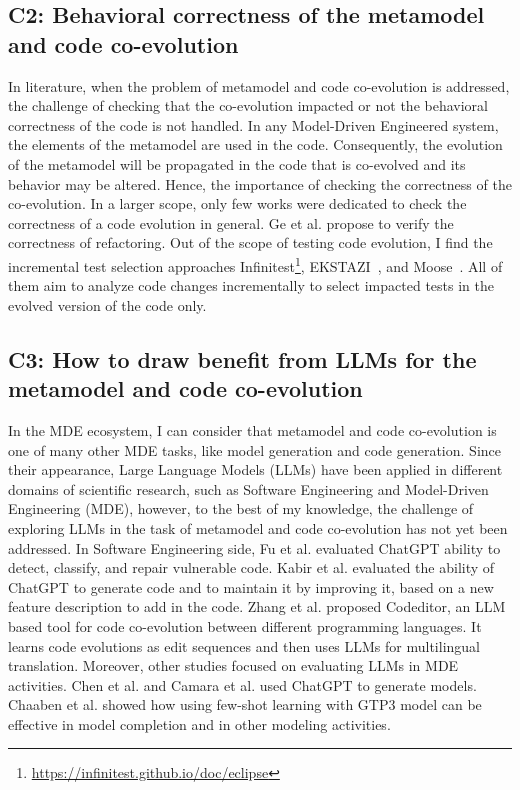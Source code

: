  

\subsection*{C2: Behavioral correctness of the metamodel and code co-evolution}
\label{C2}
In literature, when the problem of metamodel and code co-evolution is addressed, the challenge of checking that the co-evolution impacted or not the behavioral correctness of the code is not handled. In any Model-Driven Engineered system, the elements of the metamodel are used in the code. Consequently, the evolution of the metamodel will be propagated in the code that is co-evolved and its behavior may be altered. Hence, the importance of checking the correctness of the co-evolution. In a larger scope, only few works were dedicated to check the correctness of a code evolution in general. %
 Ge et al. \cite{10.1145/2568225.2568280} propose to verify the correctness of refactoring.
Out of the scope of testing code evolution, I find the incremental test selection approaches Infinitest\footnote{\url{https://infinitest.github.io/doc/eclipse}}, EKSTAZI~\cite{7203050}, and Moose~\cite{ducasse2000moose}. All of them aim to analyze code changes incrementally to select impacted tests in the evolved version of the code only.

\subsection*{C3: How to draw benefit from LLMs for the metamodel and code co-evolution}
\label{C3}
In the MDE ecosystem, I can consider that metamodel and code co-evolution is one of many other MDE tasks, like model generation and code generation. Since their appearance, Large Language Models (LLMs) have been applied in different domains of scientific research, such as Software Engineering and Model-Driven Engineering (MDE), however, to the best of my knowledge, the challenge of exploring LLMs in the task of metamodel and code co-evolution has not yet been addressed. In Software Engineering side, Fu et al. \cite{fu2023chatgpt} evaluated ChatGPT ability to detect, classify, and repair vulnerable code. Kabir et al. \cite{kabir2023empirical} evaluated the ability of ChatGPT to generate code and to maintain it by improving it, based on a new feature description to add in the code. Zhang et al. \cite{zhang2023multilingual} proposed Codeditor, an LLM based tool for code co-evolution between different programming languages. It learns code evolutions as edit sequences and then uses LLMs for multilingual translation.
Moreover, other studies focused on evaluating LLMs in MDE activities. 
Chen et al. \cite{10344012} and Camara et al. \cite{camara2023assessment} used ChatGPT to generate models.
Chaaben et al. \cite{chaaben2023towards} showed how using few-shot learning with GTP3 model can be effective in model completion and in other modeling activities. 
%
